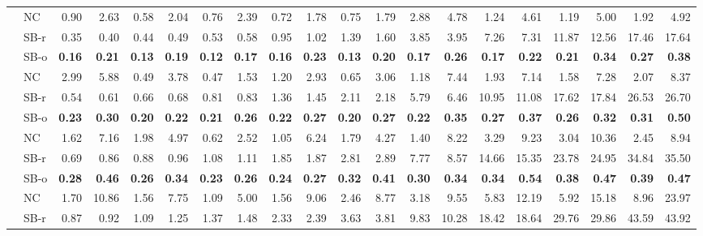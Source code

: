 \documentclass[runningheads,a4paper]{llncs}
\begin{document}
\begin{sidewaystable}
\begin{tabularx}{1\textwidth}{p{0.8cm}p{0.8cm}|RR|RR|RR|RR|RR|RR|RR|RR|RR}
\hline
\centering{} & \centering NC & 0.90 & 2.63 & 0.58 & 2.04 & 0.76 & 2.39 & 0.72 & 1.78 & 0.75 & 1.79 & 2.88 & 4.78 & 1.24 & 4.61 & 1.19 & 5.00 & 1.92 & 4.92 \\
 & \centering SB-r  & 0.35 & 0.40 & 0.44 & 0.49 & 0.53 & 0.58 & 0.95 & 1.02 & 1.39 & 1.60 & 3.85 & 3.95 & 7.26 & 7.31 & 11.87 & 12.56 & 17.46 & 17.64 \\
 & \centering SB-o  & \textbf{0.16} & \textbf{0.21} & \textbf{0.13} & \textbf{0.19} & \textbf{0.12} & \textbf{0.17} & \textbf{0.16} & \textbf{0.23} & \textbf{0.13} & \textbf{0.20} & \textbf{0.17} & \textbf{0.26} & \textbf{0.17} & \textbf{0.22} & \textbf{0.21} & \textbf{0.34} & \textbf{0.27} & \textbf{0.38} \\
\hline
\centering{} & \centering NC & 2.99 & 5.88 & 0.49 & 3.78 & 0.47 & 1.53 & 1.20 & 2.93 & 0.65 & 3.06 & 1.18 & 7.44 & 1.93 & 7.14 & 1.58 & 7.28 & 2.07 & 8.37 \\
 & \centering SB-r  & 0.54 & 0.61 & 0.66 & 0.68 & 0.81 & 0.83 & 1.36 & 1.45 & 2.11 & 2.18 & 5.79 & 6.46 & 10.95 & 11.08 & 17.62 & 17.84 & 26.53 & 26.70 \\
 & \centering SB-o  & \textbf{0.23} & \textbf{0.30} & \textbf{0.20} & \textbf{0.22} & \textbf{0.21} & \textbf{0.26} & \textbf{0.22} & \textbf{0.27} & \textbf{0.20} & \textbf{0.27} & \textbf{0.22} & \textbf{0.35} & \textbf{0.27} & \textbf{0.37} & \textbf{0.26} & \textbf{0.32} & \textbf{0.31} & \textbf{0.50} \\
\hline
\centering{} & \centering NC & 1.62 & 7.16 & 1.98 & 4.97 & 0.62 & 2.52 & 1.05 & 6.24 & 1.79 & 4.27 & 1.40 & 8.22 & 3.29 & 9.23 & 3.04 & 10.36 & 2.45 & 8.94 \\
 & \centering SB-r  & 0.69 & 0.86 & 0.88 & 0.96 & 1.08 & 1.11 & 1.85 & 1.87 & 2.81 & 2.89 & 7.77 & 8.57 & 14.66 & 15.35 & 23.78 & 24.95 & 34.84 & 35.50 \\
 & \centering SB-o  & \textbf{0.28} & \textbf{0.46} & \textbf{0.26} & \textbf{0.34} & \textbf{0.23} & \textbf{0.26} & \textbf{0.24} & \textbf{0.27} & \textbf{0.32} & \textbf{0.41} & \textbf{0.30} & \textbf{0.34} & \textbf{0.34} & \textbf{0.54} & \textbf{0.38} & \textbf{0.47} & \textbf{0.39} & \textbf{0.47} \\
\hline
\centering{} & \centering NC & 1.70 & 10.86 & 1.56 & 7.75 & 1.09 & 5.00 & 1.56 & 9.06 & 2.46 & 8.77 & 3.18 & 9.55 & 5.83 & 12.19 & 5.92 & 15.18 & 8.96 & 23.97 \\
 & \centering SB-r  & 0.87 & 0.92 & 1.09 & 1.25 & 1.37 & 1.48 & 2.33 & 2.39 & 3.63 & 3.81 & 9.83 & 10.28 & 18.42 & 18.64 & 29.76 & 29.86 & 43.59 & 43.92 \\

\end{tabularx}
\end{sidewaystable}
\end{document}
